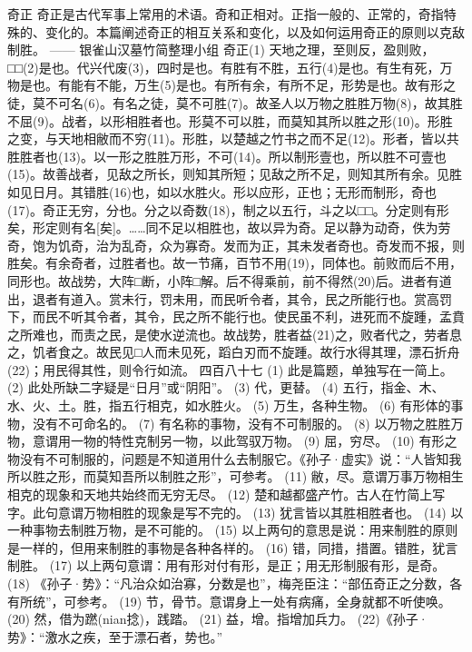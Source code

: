 \documentclass[12pt,UTF8]{ctexbook}
\begin{document}
奇正
奇正是古代军事上常用的术语。奇和正相对。正指一般的、正常的，奇指特殊的、变化的。本篇阐述奇正的相互关系和变化，以及如何运用奇正的原则以克敌制胜。
—— 银雀山汉墓竹简整理小组
奇正(1)
天地之理，至则反，盈则败，□□(2)是也。代兴代废(3)，四时是也。有胜有不胜，五行(4)是也。有生有死，万物是也。有能有不能，万生(5)是也。有所有余，有所不足，形势是也。故有形之徒，莫不可名(6)。有名之徒，莫不可胜(7)。故圣人以万物之胜胜万物(8)，故其胜不屈(9)。战者，以形相胜者也。形莫不可以胜，而莫知其所以胜之形(10)。形胜之变，与天地相敝而不穷(11)。形胜，以楚越之竹书之而不足(12)。形者，皆以共胜胜者也(13)。以一形之胜胜万形，不可(14)。所以制形壹也，所以胜不可壹也(15)。故善战者，见敌之所长，则知其所短；见敌之所不足，则知其所有余。见胜如见日月。其错胜(16)也，如以水胜火。形以应形，正也；无形而制形，奇也(17)。奇正无穷，分也。分之以奇数(18)，制之以五行，斗之以□□。分定则有形矣，形定则有名[矣]。……同不足以相胜也，故以异为奇。足以静为动奇，佚为劳奇，饱为饥奇，治为乱奇，众为寡奇。发而为正，其未发者奇也。奇发而不报，则胜矣。有余奇者，过胜者也。故一节痛，百节不用(19)，同体也。前败而后不用，同形也。故战势，大阵□断，小阵□解。后不得乘前，前不得然(20)后。进者有道出，退者有道入。赏未行，罚未用，而民听令者，其令，民之所能行也。赏高罚下，而民不听其令者，其令，民之所不能行也。使民虽不利，进死而不旋踵，孟賁之所难也，而责之民，是使水逆流也。故战势，胜者益(21)之，败者代之，劳者息之，饥者食之。故民见□人而未见死，蹈白刃而不旋踵。故行水得其理，漂石折舟(22)；用民得其性，则令行如流。 四百八十七
(1) 此是篇题，单独写在一简上。
(2) 此处所缺二字疑是“日月”或“阴阳”。
(3) 代，更替。
(4) 五行，指金、木、水、火、土。胜，指五行相克，如水胜火。
(5) 万生，各种生物。
(6) 有形体的事物，没有不可命名的。
(7) 有名称的事物，没有不可制服的。
(8) 以万物之胜胜万物，意谓用一物的特性克制另一物，以此驾驭万物。
(9) 屈，穷尽。
(10) 有形之物没有不可制服的，问题是不知道用什么去制服它。《孙子·虚实》说：“人皆知我所以胜之形，而莫知吾所以制胜之形”，可参考。
(11) 敝，尽。意谓万事万物相生相克的现象和天地共始终而无穷无尽。
(12) 楚和越都盛产竹。古人在竹简上写字。此句意谓万物相胜的现象是写不完的。
(13) 犹言皆以其胜相胜者也。
(14) 以一种事物去制胜万物，是不可能的。
(15) 以上两句的意思是说：用来制胜的原则是一样的，但用来制胜的事物是各种各样的。
(16) 错，同措，措置。错胜，犹言制胜。
(17) 以上两句意谓：用有形对付有形，是正；用无形制服有形，是奇。
(18) 《孙子·势》：“凡治众如治寡，分数是也”，梅尧臣注：“部伍奇正之分数，各有所统”，可参考。
(19) 节，骨节。意谓身上一处有病痛，全身就都不听使唤。
(20) 然，借为蹨(nian捻)，践踏。
(21) 益，增。指增加兵力。
(22)《孙子·势》：“激水之疾，至于漂石者，势也。”　
\end{document}
